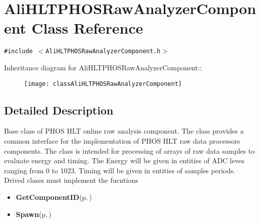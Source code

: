 \section{Ali\-HLTPHOSRaw\-Analyzer\-Component Class Reference}
\label{classAliHLTPHOSRawAnalyzerComponent}
{\tt \#include $<$Ali\-HLTPHOSRaw\-Analyzer\-Component.h$>$}

Inheritance diagram for Ali\-HLTPHOSRaw\-Analyzer\-Component::\begin{figure}[H]
\begin{center}
\leavevmode
\texttt{[image: classAliHLTPHOSRawAnalyzerComponent]}
\end{center}
\end{figure}


\subsection{Detailed Description}
Base class of PHOS HLT online raw analysis component. The class provides a common interface for the implementation of PHOS HLT raw data processors components. The class is intended for processing of arrays of raw data samples to evaluate energy and timing. The Energy will be given in entities of ADC leves ranging from 0 to 1023. Timing will be given in entities of samples periods. Drived clases must implement the fucntions\begin{itemize}
\item {\bf Get\-Component\-ID}{\rm (p.\,\pageref{classAliHLTPHOSRawAnalyzerComponent_AliHLTPHOSRawAnalyzerComponenta13})}\item {\bf Spawn}{\rm (p.\,\pageref{classAliHLTPHOSRawAnalyzerComponent_AliHLTPHOSRawAnalyzerComponenta17})} \end{itemize}




